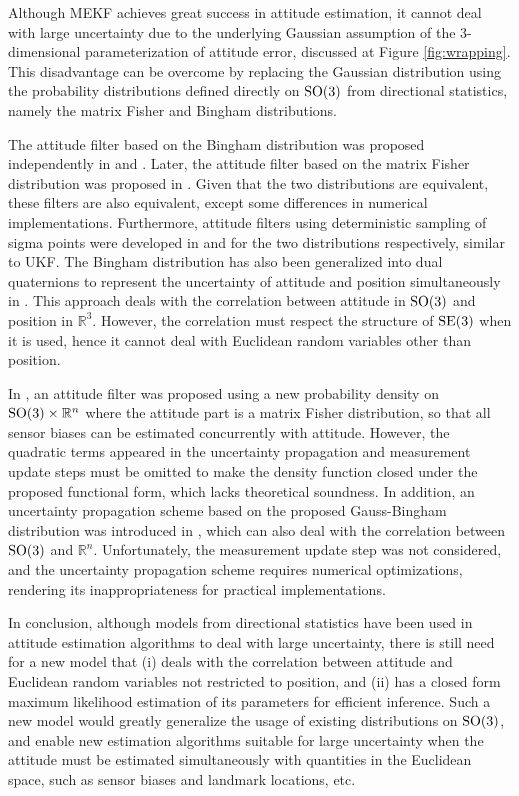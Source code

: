 Although MEKF achieves great success in attitude estimation, it cannot deal with large uncertainty due to the underlying Gaussian assumption of the 3-dimensional parameterization of attitude error, discussed at Figure \ref{fig:wrapping}.
This disadvantage can be overcome by replacing the Gaussian distribution using the probability distributions defined directly on $\mathrm{SO}(3)$ from directional statistics, namely the matrix Fisher and Bingham distributions.

The attitude filter based on the Bingham distribution was proposed independently in \cite{glover2014tracking} and \cite{kurz2014recursive}.
Later, the attitude filter based on the matrix Fisher distribution was proposed in \cite{lee2018bayesian}.
Given that the two distributions are equivalent, these filters are also equivalent, except some differences in numerical implementations.
Furthermore, attitude filters using deterministic sampling of sigma points were developed in \cite{gilitschenski2015unscented} and \cite{lee2018bayesian} for the two distributions respectively, similar to UKF.
The Bingham distribution has also been generalized into dual quaternions to represent the uncertainty of attitude and position simultaneously in \cite{gilitschenski2014new,li2019geometry,li2020unscented,arun2018probabilistic}.
This approach deals with the correlation between attitude in $\mathrm{SO}(3)$ and position in $\mathbb{R}^3$.
However, the correlation must respect the structure of $\mathrm{SE}(3)$ when it is used, hence it cannot deal with Euclidean random variables other than position.

In \cite{markley2006attitude}, an attitude filter was proposed using a new probability density on $\mathrm{SO}(3)\times \mathbb{R}^n$ where the attitude part is a matrix Fisher distribution, so that all sensor biases can be estimated concurrently with attitude.
However, the quadratic terms appeared in the uncertainty propagation and measurement update steps must be omitted to make the density function closed under the proposed functional form, which lacks theoretical soundness.
In addition, an uncertainty propagation scheme based on the proposed Gauss-Bingham distribution was introduced in \cite{darling2016uncertainty}, which can also deal with the correlation between $\mathrm{SO}(3)$ and $\mathbb{R}^n$.
Unfortunately, the measurement update step was not considered, and the uncertainty propagation scheme requires numerical optimizations, rendering its inappropriateness for practical implementations.

In conclusion, although models from directional statistics have been used in attitude estimation algorithms to deal with large uncertainty, there is still need for a new model that (i) deals with the correlation between attitude and Euclidean random variables not restricted to position,
and (ii) has a closed form maximum likelihood estimation of its parameters for efficient inference.
Such a new model would greatly generalize the usage of existing distributions on $\mathrm{SO}(3)$, and enable new estimation algorithms suitable for large uncertainty when the attitude must be estimated simultaneously with quantities in the Euclidean space, such as sensor biases and landmark locations, etc.

